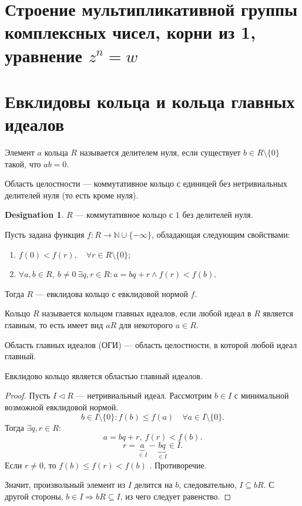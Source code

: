 \documentclass[11pt]{book}
\newcommand{\N}{\mathbb{N}}
\renewcommand{\le}{\leqslant}
\theoremstyle{definition}
\theoremstyle{plain}
\theoremstyle{plain}
\theoremstyle{definition}
\newtheorem*{name}{Designation}
\theoremstyle{remark}
\begin{document}
\section{Строение мультипликативной группы комплексных чисел, корни из 1, уравнение $ z^{n} = w$}
\section{Евклидовы кольца и кольца главных идеалов}
\begin{defn}
    Элемент $ a $ кольца $ R$ называется {\sf делителем  нуля}, если существует  $ b \in R \setminus \{0\}$ такой, что $ ab = 0$.

    {\sf Область целостности} --- коммутативное кольцо с единицей без  нетривиальных делителей нуля (то есть кроме нуля).
\end{defn}
\begin{name}
    $ R$ --- коммутативное кольцо с $ 1$ без делителей нуля.
\end{name}
\begin{defn}
    Пусть задана функция $ f: R \to  \N \cup \{-\infty\}$, обладающая следующим свойствами:
    \begin{enumerate}[noitemsep]
	\item $ f(0) < f(r), \quad \forall  r \in  R \setminus \{0\}$;
	\item $ \forall a, b \in  R, ~b\ne 0 ~ \exists  q, r \in R: a = b q + r \wedge f(r) < f(b)$.
    \end{enumerate}
    Тогда $ R$ --- {\sf евклидова кольцо с евклидовой нормой  $ f$}.
\end{defn}
\begin{defn}
    Кольцо $ R$ называется {\sf  кольцом главных идеалов}, если любой идеал в  $ R$ является главным, то есть имеет вид  $ aR$ для некоторого  $ a \in R$.

    {\sf Область главных идеалов (ОГИ)} --- область целостности, в которой любой идеал главный.
\end{defn}
\begin{thm}
    Евклидово кольцо является областью главный идеалов.
\end{thm}
\begin{proof}
    Пусть  $ I \triangleleft  R$ --- нетривиальный идеал.
    Рассмотрим $ b \in I$ с минимальной возможной евклидовой нормой.
    \[
	b \in  I \setminus \{0\}: f(b) \le  f(a) \quad \forall  a \in  I \setminus \{0\}
    .\]
    Тогда $ \exists q, r \in R$:
    \[
	a = b q + r , ~ f(r) < f(b)
    .\]
    \[
	r = \underbrace{a}_{\in I} - \underbrace{bq}_{ \in  I} \in  I
    .\]
    Если $r \ne 0$, то $ f(b) \le  f(r) < f(b)$ . Противоречие.

    Значит, произвольный элемент из $ I$ делится на  $ b$, следовательно,  $ I \subseteq bR$. С другой стороны, $ b \in I \Longrightarrow bR \subseteq I$, из чего следует равенство.
\end{proof}
\end{document}
